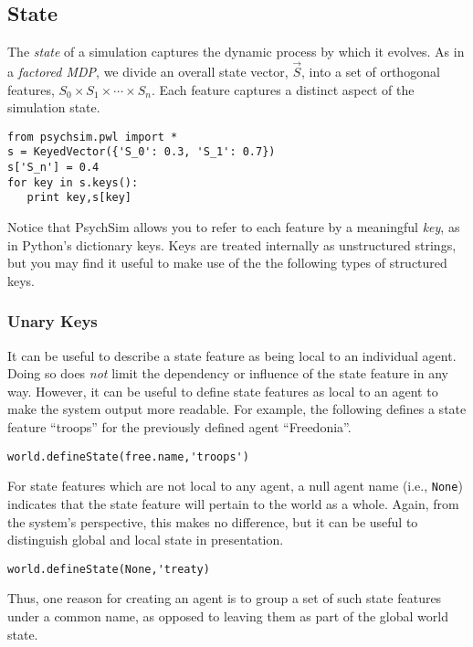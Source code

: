 \documentclass{article}
\begin{document}
\subsection{State}
The {\em state} of a simulation captures the dynamic process by which it evolves. As in a {\em factored MDP}, we divide an overall state vector, $\vec S$, into a set of orthogonal features, $S_0\times S_1\times\cdots\times S_n$. Each feature captures a distinct aspect of the simulation state. 

\begin{verbatim}
from psychsim.pwl import *
s = KeyedVector({'S_0': 0.3, 'S_1': 0.7})
s['S_n'] = 0.4
for key in s.keys():
   print key,s[key]
\end{verbatim}

Notice that PsychSim allows you to refer to each feature by a meaningful {\em key}, as in Python's dictionary keys. Keys are treated internally as unstructured strings, but you may find it useful to make use of the the following types of structured keys.

\subsubsection{Unary Keys}
It can be useful to describe a state feature as being local to an individual agent. Doing so does {\em not} limit the dependency or influence of the state feature in any way. However, it can be useful to define state features as local to an agent to make the system output more readable. For example, the following defines a state feature ``troops'' for the previously defined agent ``Freedonia''.

\begin{verbatim}
world.defineState(free.name,'troops')
\end{verbatim}

For state features which are not local to any agent, a null agent name (i.e., {\tt None}) indicates that the state feature will pertain to the world as a whole. Again, from the system's perspective, this makes no difference, but it can be useful to distinguish global and local state in presentation.

\begin{verbatim}
world.defineState(None,'treaty)
\end{verbatim}

Thus, one reason for creating an agent is to group a set of such state features under a common name, as opposed to leaving them as part of the global world state.
\end{document}

